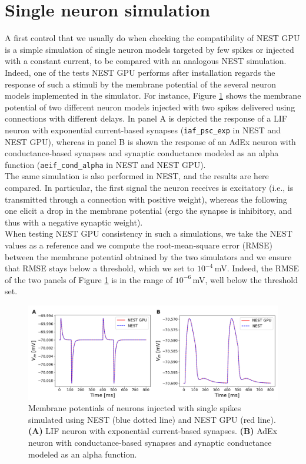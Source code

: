 \documentclass[a4paper, 12pt, twoside, openright]{book}
\begin{document}
\section{Single neuron simulation}
A first control that we usually do when checking the compatibility of NEST GPU is a simple simulation of single neuron models targeted by few spikes or injected with a constant current, to be compared with an analogous NEST simulation. Indeed, one of the tests NEST GPU performs after installation regards the response of such a stimuli by the membrane potential of the several neuron models implemented in the simulator. For instance, Figure \ref{fig:single_neurons_membrane_potential} shows the membrane potential of two different neuron models injected with two spikes delivered using connections with different delays. In panel A is depicted the response of a LIF neuron with exponential current-based synapses (\texttt{iaf\_psc\_exp} in NEST and NEST GPU), whereas in panel B is shown the response of an AdEx neuron with conductance-based synapses and synaptic conductance modeled as an alpha function (\texttt{aeif\_cond\_alpha} in NEST and NEST GPU).\\
The same simulation is also performed in NEST, and the results are here compared.
In particular, the first signal the neuron receives is excitatory (i.e., is transmitted through a connection with positive weight), whereas the following one elicit a drop in the membrane potential (ergo the synapse is inhibitory, and thus with a negative synaptic weight).\\
When testing NEST GPU consistency in such a simulations, we take the NEST values as a reference and we compute the root-mean-square error (RMSE) between the membrane potential obtained by the two simulators and we ensure that RMSE stays below a threshold, which we set to $10^{-4}$\,mV. Indeed, the RMSE of the two panels of Figure \ref{fig:single_neurons_membrane_potential} is in the range of $10^{-6}$\,mV, well below the threshold set.

\begin{figure}[H]
    \centering
    \includegraphics[width=\columnwidth]{figures/single_neurons.png}
    \caption{Membrane potentials of neurons injected with single spikes simulated using NEST (blue dotted line) and NEST GPU (red line). \textbf{(A)} LIF neuron with exponential current-based synapses. \textbf{(B)} AdEx neuron with conductance-based synapses and synaptic conductance modeled as an alpha function.}
    \label{fig:single_neurons_membrane_potential}
\end{figure}
\end{document}
